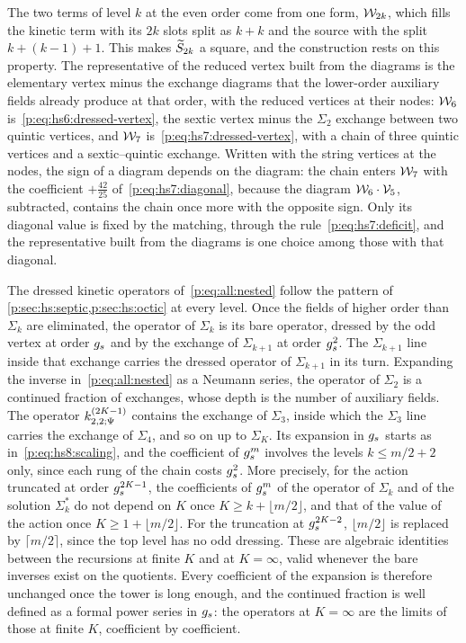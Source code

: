 The two terms of level $k$ at the even order come from one form, $\dvertex{2 k}$, which fills the kinetic term with its $2 k$ slots split as $k + k$ and the source with the split $k + (k - 1) + 1$.
This makes $\caction[2 k]$ a square, and the construction rests on this property.
The representative of the reduced vertex built from the diagrams is the elementary vertex minus the exchange diagrams that the lower-order auxiliary fields already produce at that order, with the reduced vertices at their nodes: $\dvertex{6}$ is~\eqref{p:eq:hs6:dressed-vertex}, the sextic vertex minus the $\Sigma_2$ exchange between two quintic vertices, and $\dvertex{7}$ is~\eqref{p:eq:hs7:dressed-vertex}, with a chain of three quintic vertices and a sextic--quintic exchange.
Written with the string vertices at the nodes, the sign of a diagram depends on the diagram: the chain enters $\dvertex{7}$ with the coefficient $+ \tfrac{42}{25}$ of~\eqref{p:eq:hs7:diagonal}, because the diagram $\dvertex{6} \cdot \vertex{5}$, subtracted, contains the chain once more with the opposite sign.
Only its diagonal value is fixed by the matching, through the rule~\eqref{p:eq:hs7:deficit}, and the representative built from the diagrams is one choice among those with that diagonal.

The dressed kinetic operators of~\eqref{p:eq:all:nested} follow the pattern of \cref{p:sec:hs:septic,p:sec:hs:octic} at every level.
Once the fields of higher order than $\Sigma_k$ are eliminated, the operator of $\Sigma_k$ is its bare operator, dressed by the odd vertex at order $\gs$ and by the exchange of $\Sigma_{k + 1}$ at order $\gs^2$.
The $\Sigma_{k + 1}$ line inside that exchange carries the dressed operator of $\Sigma_{k + 1}$ in its turn.
Expanding the inverse in~\eqref{p:eq:all:nested} as a Neumann series, the operator of $\Sigma_2$ is a continued fraction of exchanges, whose depth is the number of auxiliary fields.
The operator $\kin{2}{\Psi}{2 K - 1}$ contains the exchange of $\Sigma_3$, inside which the $\Sigma_3$ line carries the exchange of $\Sigma_4$, and so on up to $\Sigma_K$.
Its expansion in $\gs$ starts as in~\eqref{p:eq:hs8:scaling}, and the coefficient of $\gs^m$ involves the levels $k \le m / 2 + 2$ only, since each rung of the chain costs $\gs^2$.
More precisely, for the action truncated at order $\gs^{2 K - 1}$, the coefficients of $\gs^m$ of the operator of $\Sigma_k$ and of the solution $\Sigma_k^*$ do not depend on $K$ once $K \ge k + \lfloor m / 2 \rfloor$, and that of the value of the action once $K \ge 1 + \lfloor m / 2 \rfloor$.
For the truncation at $\gs^{2 K - 2}$, $\lfloor m / 2 \rfloor$ is replaced by $\lceil m / 2 \rceil$, since the top level has no odd dressing.
These are algebraic identities between the recursions at finite $K$ and at $K = \infty$, valid whenever the bare inverses exist on the quotients.
Every coefficient of the expansion is therefore unchanged once the tower is long enough, and the continued fraction is well defined as a formal power series in $\gs$: the operators at $K = \infty$ are the limits of those at finite $K$, coefficient by coefficient.

